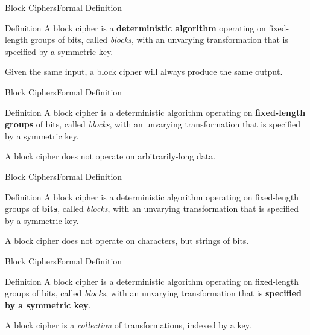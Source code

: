 \documentclass[12pt]{beamer}
\begin{document}
\begin{frame}{Block Ciphers}{Formal Definition}
	\begin{block}{Definition}
		A block cipher is a \textbf{deterministic algorithm} operating on fixed-length
		groups of bits, called \textit{blocks}, with an unvarying transformation
		that is specified by a symmetric key.
	\end{block}

	\begin{block}{}
		Given the same input, a block cipher will always produce the same
		output.
	\end{block}
\end{frame}

\begin{frame}{Block Ciphers}{Formal Definition}
	\begin{block}{Definition}
		A block cipher is a deterministic algorithm operating on \textbf{fixed-length
		groups} of bits, called \textit{blocks}, with an unvarying transformation
		that is specified by a symmetric key.
	\end{block}

	\begin{block}{}
		A block cipher does not operate on arbitrarily-long data.
	\end{block}
\end{frame}

\begin{frame}{Block Ciphers}{Formal Definition}
	\begin{block}{Definition}
		A block cipher is a deterministic algorithm operating on fixed-length
		groups of \textbf{bits}, called \textit{blocks}, with an unvarying transformation
		that is specified by a symmetric key.
	\end{block}

	\begin{block}{}
		A block cipher does not operate on characters, but strings of bits.
	\end{block}
\end{frame}

\begin{frame}{Block Ciphers}{Formal Definition}
	\begin{block}{Definition}
		A block cipher is a deterministic algorithm operating on fixed-length
		groups of bits, called \textit{blocks}, with an unvarying transformation
		that is \textbf{specified by a symmetric key}.
	\end{block}

	\begin{block}{}
		A block cipher is a \textit{collection} of transformations, indexed by a
		key.
	\end{block}
\end{frame}
\end{document}
